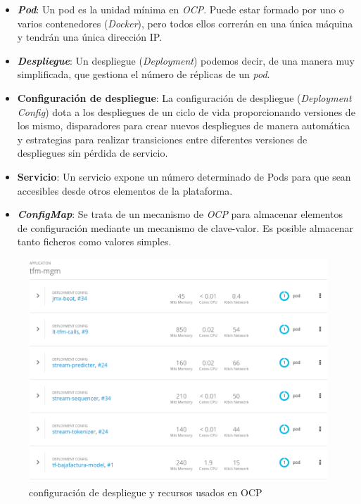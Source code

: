 \begin{itemize}
\item  \textit{\textbf{Pod}}: Un pod es la unidad mínima en \textit{OCP}. Puede estar formado por uno o varios contenedores (\textit{Docker}), pero todos ellos correrán en una única máquina y tendrán una única dirección IP.

\item  \textit{\textbf{Despliegue}}: Un despliegue (\textit{Deployment}) podemos decir, de una manera muy simplificada, que gestiona el número de réplicas de un \textit{pod}. 

\item  \textbf{Configuración de despliegue}: La configuración de despliegue (\textit{Deployment Config}) dota a los despliegues de un ciclo de vida proporcionando versiones de los mismo, disparadores para crear nuevos despliegues de manera automática y estrategias para realizar transiciones entre diferentes versiones de despliegues sin pérdida de servicio. 

\item  \textbf{Servicio}: Un servicio expone un número determinado de Pods para que sean accesibles desde otros elementos de la plataforma. 

\item  \textbf{\textit{ConfigMap}}: Se trata de un mecanismo de \textit{OCP} para almacenar elementos de configuración mediante un mecanismo de clave-valor. Es posible almacenar tanto ficheros como valores simples.


\end{itemize}

\begin{figure}[!ht]
	\centering
	\includegraphics[width=1\textwidth]{images/cont/overview}
	\caption{configuración de despliegue y recursos usados en OCP}
	\label{fig:ocp-overview}
\end{figure}

